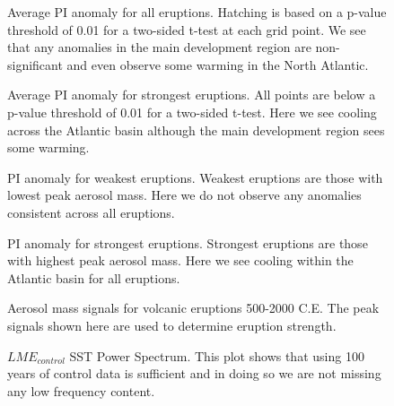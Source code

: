 \begin{figure}[!tbp]
\centering
\caption{Average PI anomaly for all eruptions. Hatching is based on a p-value threshold of 0.01 for a two-sided t-test at each grid point. We see that any anomalies in the main development region are non-significant and even observe some warming in the North Atlantic.}
\label{pi_all_avg}
\end{figure}

\begin{figure}[!tbp]
\centering
\caption{Average PI anomaly for strongest eruptions. All points are below a p-value threshold of 0.01 for a two-sided t-test. Here we see cooling across the Atlantic basin although the main development region sees some warming.}
\label{pi_10_avg}
\end{figure}

\begin{figure}[!tbp]
\centering
\caption{PI anomaly for weakest eruptions. Weakest eruptions are those with lowest peak aerosol mass. Here we do not observe any anomalies consistent across all eruptions.}
\label{pi_10_wk}
\end{figure}

\begin{figure}[!tbp]
\centering
\caption{PI anomaly for strongest eruptions. Strongest eruptions are those with highest peak aerosol mass. Here we see cooling within the Atlantic basin for all eruptions.}
\label{pi_10_str}
\end{figure}

\begin{figure}[!tbp]
\centering
\begin{minipage}[b]{0.45\textwidth}
\caption{Aerosol mass signals for volcanic eruptions 500-2000 C.E. The peak signals shown here are used to determine eruption strength. }
\label{erups_plot}
\end{minipage}
\hfill
\begin{minipage}[b]{0.45\textwidth}
\caption{$LME_{control}$ SST Power Spectrum. This plot shows that using 100 years of control data is sufficient and in doing so we are not missing any low frequency content.}
\label{spectrum}
\end{minipage}
\end{figure}

